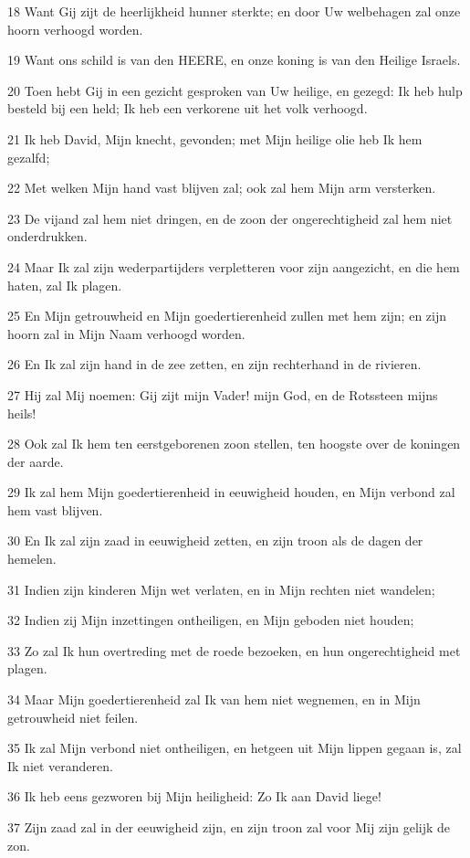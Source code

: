 \par 18 Want Gij zijt de heerlijkheid hunner sterkte; en door Uw welbehagen zal onze hoorn verhoogd worden.
\par 19 Want ons schild is van den HEERE, en onze koning is van den Heilige Israels.
\par 20 Toen hebt Gij in een gezicht gesproken van Uw heilige, en gezegd: Ik heb hulp besteld bij een held; Ik heb een verkorene uit het volk verhoogd.
\par 21 Ik heb David, Mijn knecht, gevonden; met Mijn heilige olie heb Ik hem gezalfd;
\par 22 Met welken Mijn hand vast blijven zal; ook zal hem Mijn arm versterken.
\par 23 De vijand zal hem niet dringen, en de zoon der ongerechtigheid zal hem niet onderdrukken.
\par 24 Maar Ik zal zijn wederpartijders verpletteren voor zijn aangezicht, en die hem haten, zal Ik plagen.
\par 25 En Mijn getrouwheid en Mijn goedertierenheid zullen met hem zijn; en zijn hoorn zal in Mijn Naam verhoogd worden.
\par 26 En Ik zal zijn hand in de zee zetten, en zijn rechterhand in de rivieren.
\par 27 Hij zal Mij noemen: Gij zijt mijn Vader! mijn God, en de Rotssteen mijns heils!
\par 28 Ook zal Ik hem ten eerstgeborenen zoon stellen, ten hoogste over de koningen der aarde.
\par 29 Ik zal hem Mijn goedertierenheid in eeuwigheid houden, en Mijn verbond zal hem vast blijven.
\par 30 En Ik zal zijn zaad in eeuwigheid zetten, en zijn troon als de dagen der hemelen.
\par 31 Indien zijn kinderen Mijn wet verlaten, en in Mijn rechten niet wandelen;
\par 32 Indien zij Mijn inzettingen ontheiligen, en Mijn geboden niet houden;
\par 33 Zo zal Ik hun overtreding met de roede bezoeken, en hun ongerechtigheid met plagen.
\par 34 Maar Mijn goedertierenheid zal Ik van hem niet wegnemen, en in Mijn getrouwheid niet feilen.
\par 35 Ik zal Mijn verbond niet ontheiligen, en hetgeen uit Mijn lippen gegaan is, zal Ik niet veranderen.
\par 36 Ik heb eens gezworen bij Mijn heiligheid: Zo Ik aan David liege!
\par 37 Zijn zaad zal in der eeuwigheid zijn, en zijn troon zal voor Mij zijn gelijk de zon.
